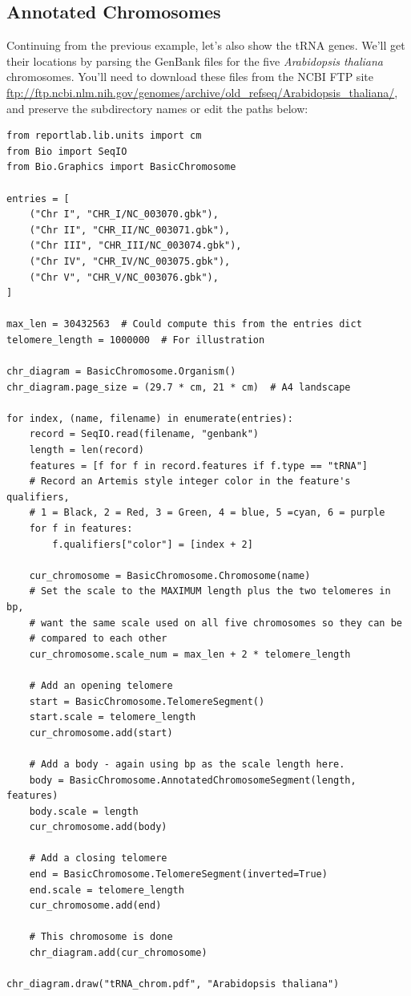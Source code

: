 \subsection{Annotated Chromosomes}

Continuing from the previous example, let's also show the tRNA genes.
We'll get their locations by parsing the GenBank files for the five
\textit{Arabidopsis thaliana} chromosomes. You'll need to download these
files from the NCBI FTP site
\url{ftp://ftp.ncbi.nlm.nih.gov/genomes/archive/old_refseq/Arabidopsis_thaliana/},
and preserve the subdirectory names or edit the paths below:

\begin{verbatim}
from reportlab.lib.units import cm
from Bio import SeqIO
from Bio.Graphics import BasicChromosome

entries = [
    ("Chr I", "CHR_I/NC_003070.gbk"),
    ("Chr II", "CHR_II/NC_003071.gbk"),
    ("Chr III", "CHR_III/NC_003074.gbk"),
    ("Chr IV", "CHR_IV/NC_003075.gbk"),
    ("Chr V", "CHR_V/NC_003076.gbk"),
]

max_len = 30432563  # Could compute this from the entries dict
telomere_length = 1000000  # For illustration

chr_diagram = BasicChromosome.Organism()
chr_diagram.page_size = (29.7 * cm, 21 * cm)  # A4 landscape

for index, (name, filename) in enumerate(entries):
    record = SeqIO.read(filename, "genbank")
    length = len(record)
    features = [f for f in record.features if f.type == "tRNA"]
    # Record an Artemis style integer color in the feature's qualifiers,
    # 1 = Black, 2 = Red, 3 = Green, 4 = blue, 5 =cyan, 6 = purple
    for f in features:
        f.qualifiers["color"] = [index + 2]

    cur_chromosome = BasicChromosome.Chromosome(name)
    # Set the scale to the MAXIMUM length plus the two telomeres in bp,
    # want the same scale used on all five chromosomes so they can be
    # compared to each other
    cur_chromosome.scale_num = max_len + 2 * telomere_length

    # Add an opening telomere
    start = BasicChromosome.TelomereSegment()
    start.scale = telomere_length
    cur_chromosome.add(start)

    # Add a body - again using bp as the scale length here.
    body = BasicChromosome.AnnotatedChromosomeSegment(length, features)
    body.scale = length
    cur_chromosome.add(body)

    # Add a closing telomere
    end = BasicChromosome.TelomereSegment(inverted=True)
    end.scale = telomere_length
    cur_chromosome.add(end)

    # This chromosome is done
    chr_diagram.add(cur_chromosome)

chr_diagram.draw("tRNA_chrom.pdf", "Arabidopsis thaliana")
\end{verbatim}

